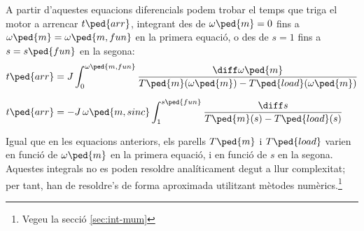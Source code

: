A partir d'aquestes equacions diferencials podem trobar el temps que triga el motor a arrencar $t\ped{arr}$, integrant des de $\omega\ped{m}=0$ fins a $\omega\ped{m}=\omega\ped{m,fun}$ en la primera equació, o des de $s = 1$ fins a $s = s\ped{fun}$ en la segona:
\begin{subequations}
\begin{align}
    t\ped{arr} &= J\int_{0}^{\omega\ped{m,fun}} \frac{\diff\omega\ped{m}}{T\ped{m}(\omega\ped{m})-T\ped{load}(\omega\ped{m})}\label{eq:tarr-mot}\\[1.5ex]
    t\ped{arr} &= - J\,\omega\ped{m,sinc} \int_{1}^{s\ped{fun}} \frac{\diff s}{T\ped{m}(s)-T\ped{load}(s)}
\end{align}
\end{subequations}

Igual que en les equacions anteriors, els parells $T\ped{m}$ i $T\ped{load}$ varien en funció de $\omega\ped{m}$ en la primera equació, i en funció de $s$ en la segona. Aquestes integrals no es poden  resoldre  analíticament degut a llur complexitat; per tant,  han de resoldre's de forma aproximada utilitzant mètodes numèrics.\footnote{Vegeu la secció \ref{sec:int-mum}}


